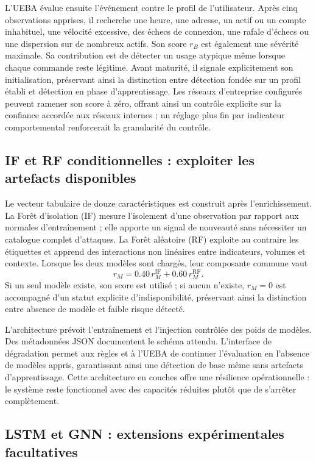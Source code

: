 \documentclass[11pt,a4paper,oneside]{report}
\theoremstyle{definition}
\theoremstyle{plain}
\begin{document}
L'UEBA évalue ensuite l'événement contre le profil de l'utilisateur. Après
cinq observations apprises, il recherche une heure, une adresse, un actif ou
un compte inhabituel, une vélocité excessive, des échecs de connexion, une
rafale d'échecs ou une dispersion sur de nombreux actifs. Son score \(r_B\)
est également une sévérité maximale. Sa contribution est de détecter un usage
atypique même lorsque chaque commande reste légitime. Avant maturité, il
signale explicitement son initialisation, préservant ainsi la distinction entre
détection fondée sur un profil établi et détection en phase d'apprentissage.
Les réseaux d'entreprise configurés peuvent ramener son score à zéro,
offrant ainsi un contrôle explicite sur la confiance accordée aux réseaux
internes ; un réglage plus fin par indicateur comportemental renforcerait la
granularité du contrôle.

\subsection{IF et RF conditionnelles : exploiter les artefacts disponibles}

Le vecteur tabulaire de douze caractéristiques est construit après
l'enrichissement. La Forêt d'isolation (IF) mesure l'isolement d'une
observation par rapport aux normales d'entraînement ; elle apporte un signal
de nouveauté sans nécessiter un catalogue complet d'attaques. La Forêt
aléatoire (RF) exploite au contraire les étiquettes et apprend des interactions
non linéaires entre indicateurs, volumes et contexte. Lorsque les deux modèles
sont chargés, leur composante commune vaut
\[
 r_M=0.40\,r_M^{\mathrm{IF}}+0.60\,r_M^{\mathrm{RF}}.
\]
Si un seul modèle existe, son score est utilisé ; si aucun n'existe,
\(r_M=0\) est accompagné d'un statut explicite d'indisponibilité, préservant
ainsi la distinction entre absence de modèle et faible risque détecté.

L'architecture prévoit l'entraînement et l'injection contrôlée des poids de
modèles. Des métadonnées JSON documentent le schéma attendu. L'interface de
dégradation permet aux règles et à l'UEBA de continuer l'évaluation en
l'absence de modèles appris, garantissant ainsi une détection de base même sans
artefacts d'apprentissage. Cette architecture en couches offre une résilience
opérationnelle : le système reste fonctionnel avec des capacités réduites
plutôt que de s'arrêter complètement.

\subsection{LSTM et GNN : extensions expérimentales facultatives}
\end{document}
